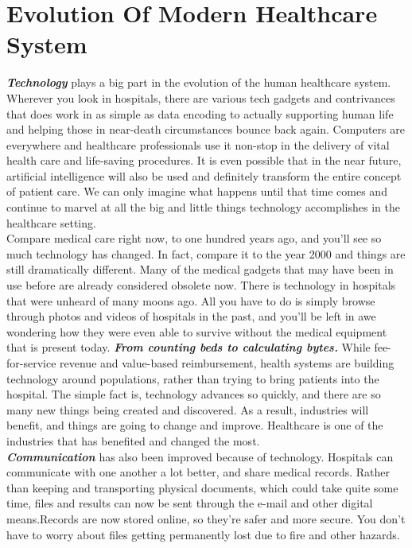 \documentclass[12pt]{article}
\begin{document}
\section{Evolution Of Modern Healthcare System}
\textbf{\emph{Technology}} plays a big part in the evolution of the human healthcare system. Wherever you look in hospitals, there are various tech gadgets and contrivances that does work in as simple as data encoding to actually supporting human life and helping those in near-death circumstances bounce back again. Computers are everywhere and healthcare professionals use it non-stop in the delivery of vital health care and life-saving procedures. It is even possible that in the near future, artificial intelligence will also be used and definitely transform the entire concept of patient care. We can only imagine what happens until that time comes and continue to marvel at all the big and little things technology accomplishes in the healthcare setting. \newline \\
Compare medical care right now, to one hundred years ago, and you’ll see so much technology has changed. In fact, compare it to the year 2000 and things are still dramatically different. Many of the medical gadgets that may have been in use before are already considered obsolete now.\newline
There is technology in hospitals that were unheard of many moons ago. All you have to do is simply browse through photos and videos of hospitals in the past, and you’ll be left in awe wondering how they were even able to survive without the medical equipment that is present today. \newline 
\textbf{\emph{From counting beds to calculating bytes.}}
While fee-for-service revenue and value-based reimbursement, health systems are building technology around populations, rather than trying to bring patients into the hospital.\newline
The simple fact is, technology advances so quickly, and there are so many new things being created and discovered. As a result, industries will benefit, and things are going to change and improve. Healthcare is one of the industries that has benefited and changed the most.\newline \\

\textbf{\emph{Communication}} has also been improved because of technology.\newline
Hospitals can communicate with one another a lot better, and share medical records. Rather than keeping and transporting physical documents, which could take quite some time, files and results can now be sent through the e-mail and other digital means.Records are now stored online, so they’re safer and more secure. You don’t have to worry about files getting permanently lost due to fire and other hazards.\newline
\end{document}

